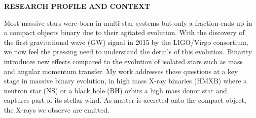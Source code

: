 \documentclass[11pt,onecolumn]{article}
\title{	
\vspace*{-2.5cm}
}
\author{\tiny} %
\date{\tiny }%
\makeatletter
\newcommand{\gw}{GW\xspace}
\newcommand*{\hmxb}{HMXB\@\xspace}
\newcommand*{\ns}{NS\@\xspace}
\newcommand*{\bh}{BH\@\xspace}
\makeatother
\begin{document}


\renewcommand{\headrulewidth}{1pt}
\pagestyle{fancy}
\fancyhf{}
\rfoot{\thepage / \pageref{LastPage}}

\vspace*{-1.2cm}
\begin{center}
\Large \textbf{RESEARCH PROFILE AND CONTEXT}\\
\end{center}
\normalfont

Most massive stars were born in multi-star systems but only a fraction ends up in a compact objects binary due to their agitated evolution. With the discovery of the first gravitational wave (\gw) signal in 2015 by the LIGO/Virgo consortium, we now feel the pressing need to understand the details of this evolution. Binarity introduces new effects compared to the evolution of isolated stars such as mass and angular momentum transfer. My work addresses these questions at a key stage in massive binary evolution, in high mass X-ray binaries (\hmxb) where a neutron star (\ns) or a black hole (\bh) orbits a high mass donor star and captures part of its stellar wind. As matter is accreted onto the compact object, the X-rays we observe are emitted. 
\end{document}
